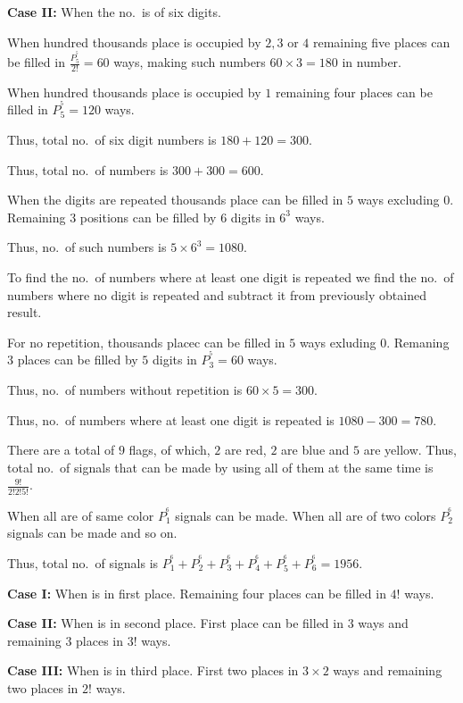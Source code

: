   {\bf Case II:} When the no.\ is of six digits.

  When hundred thousands place is occupied by $2, 3$ or $4$ remaining five places can be filled in
  $\frac{P_5^^5}{2!} = 60$ ways, making such numbers $60\times3 = 180$ in number.

  When hundred thousands place is occupied by $1$ remaining four places can be filled in $P_5^^5 = 120$ ways.

  Thus, total no.\ of six digit numbers is $180 + 120 = 300$.

  Thus, total no.\ of numbers is $300 + 300 = 600$.
\item When the digits are repeated thousands place can be filled in $5$ ways excluding $0$. Remaining $3$
  positions can be filled by $6$ digits in $6^3$ ways.

  Thus, no.\ of such numbers is $5\times6^3 = 1080$.

  To find the no.\ of numbers where at least one digit is repeated we find the no.\ of numbers where no digit
  is repeated and subtract it from previously obtained result.

  For no repetition, thousands placec can be filled in $5$ ways exluding $0$. Remaning $3$ places can be
  filled by $5$ digits in $P_3^^5 = 60$ ways.

  Thus, no.\ of numbers without repetition is $60\times 5 = 300$.

  Thus, no.\ of numbers where at least one digit is repeated is $1080 - 300 = 780$.
\item There are a total of $9$ flags, of which, $2$ are red, $2$ are blue and $5$ are yellow. Thus, total
  no.\ of signals that can be made by using all of them at the same time is $\frac{9!}{2!2!5!}$.
\item When all are of same color $P_1^^6$ signals can be made. When all are of two colors $P_2^^6$ signals
  can be made and so on.

  Thus, total no.\ of signals is $P_1^^6 + P_2^^6 + P_3^^6 + P_4^^6 + P_5^^6 + P_6^^6 = 1956$.
\item {\bf Case I:} When  is in first place. Remaining four places can be filled in $4!$ ways.

  {\bf Case II:} When  is in second place. First place can be filled in $3$ ways and remaining $3$
  places in $3!$ ways.

  {\bf Case III:} When  is in third place. First two places in $3\times2$ ways and remaining two
  places in $2!$ ways.

